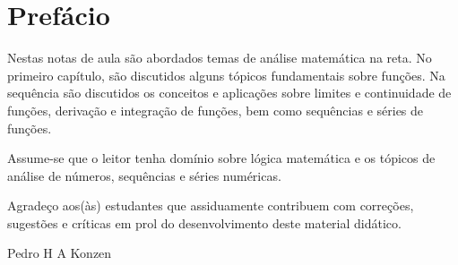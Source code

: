 
\chapter*{Prefácio}\label{prefacio}

Nestas notas de aula são abordados temas de análise matemática na reta. No primeiro capítulo, são discutidos alguns tópicos fundamentais sobre funções. Na sequência são discutidos os conceitos e aplicações sobre limites e continuidade de funções, derivação e integração de funções, bem como sequências e séries de funções.

Assume-se que o leitor tenha domínio sobre lógica matemática e os tópicos de análise de números, sequências e séries numéricas.

Agradeço aos(às) estudantes que assiduamente contribuem com correções, sugestões e críticas em prol do desenvolvimento deste material didático.

\begin{flushright}
  Pedro H A Konzen
\end{flushright}